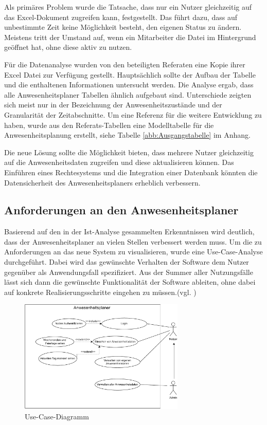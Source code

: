 Als primäres Problem wurde die Tatsache, dass nur ein Nutzer gleichzeitig auf das Excel-Dokument zugreifen kann, festgestellt. Das führt dazu, dass auf unbestimmte Zeit keine Möglichkeit besteht, den eigenen Status zu ändern. Meistens tritt der Umstand auf, wenn ein Mitarbeiter die Datei im Hintergrund geöffnet hat, ohne diese aktiv zu nutzen.

Für die Datenanalyse wurden von den beteiligten Referaten eine Kopie ihrer Excel Datei zur Verfügung gestellt. Hauptsächlich sollte der Aufbau der Tabelle und die enthaltenen Informationen untersucht werden. Die Analyse ergab, dass alle Anwesenheitsplaner Tabellen ähnlich aufgebaut sind. Unterschiede zeigten sich meist nur in der Bezeichnung der Anwesenheitszustände und der Granularität der Zeitabschnitte. Um eine Referenz für die weitere Entwicklung zu haben, wurde aus den Referats-Tabellen eine Modelltabelle für die Anwesenheitsplanung erstellt, siehe Tabelle \ref{abb:Ausgangstabelle} im Anhang.

Die neue Lösung sollte die Möglichkeit bieten, dass mehrere Nutzer gleichzeitig auf die Anwesenheitsdaten zugreifen und diese aktualisieren können. Das Einführen eines Rechtesystems und die Integration einer Datenbank könnten die Datensicherheit des Anwesenheitsplaners erheblich verbessern.

\subsection{Anforderungen an den Anwesenheitsplaner}
\label{sec:Soll-Zustand}
Basierend auf den in der Ist-Analyse gesammelten Erkenntnissen wird deutlich, dass der Anwesenheitsplaner an vielen Stellen verbessert werden muss. Um die zu Anforderungen an das neue System zu visualisieren, wurde eine Use-Case-Analyse durchgeführt. Dabei wird das gewünschte Verhalten der Software dem Nutzer gegenüber als Anwendungsfall spezifiziert. Aus der Summer aller Nutzungsfälle lässt sich dann die gewünschte Funktionalität der Software ableiten, ohne dabei auf konkrete Realisierungsschritte eingehen zu müssen.(vgl. \cite[S. 164]{neumann-2002})

\begin{figure}[htb]
    \centering
    \includegraphics[width=0.7\textwidth,angle=0]{abb/use-case-diagramm.pdf}
    \caption[Beschreibung]{Use-Case-Diagramm}
    \label{fig:Use-Case-Diagramm}
\end{figure}

